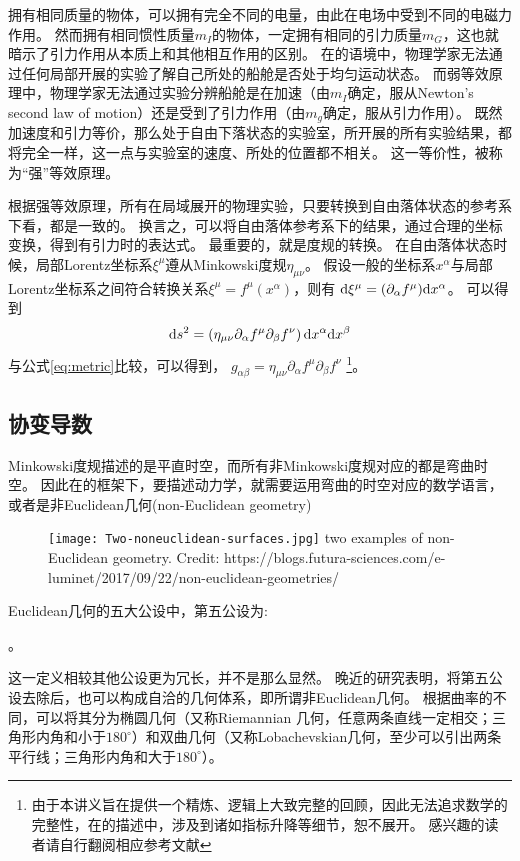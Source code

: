 拥有相同质量的物体，可以拥有完全不同的电量，由此在电场中受到不同的电磁力作用。
然而拥有相同惯性质量$m_I$的物体，一定拥有相同的引力质量$m_G$，这也就暗示了引力作用从本质上和其他相互作用的区别。
在\SR 的语境中，物理学家无法通过任何局部开展的实验了解自己所处的船舱是否处于均匀运动状态。
而弱等效原理中，物理学家无法通过实验分辨船舱是在加速（由$m_I$确定，服从Newton's second law of motion）还是受到了引力作用（由$m_g$确定，服从引力作用）。 既然加速度和引力等价，那么处于自由下落状态的实验室，所开展的所有{}实验结果，都将完全一样，这一点与实验室的速度、所处的位置都不相关。
这一等价性，被称为“强”等效原理。\cite{Schutz:FirstCourse}

根据强等效原理，所有在局域展开的物理实验，只要转换到自由落体状态的参考系下看，都是一致的。
换言之，可以将自由落体参考系下的结果，通过合理的坐标变换，得到有引力时的表达式。
最重要的，就是度规的转换。
在自由落体状态时候，局部Lorentz坐标系$\xi^\mu$遵从Minkowski度规$\eta_{\mu\nu}$。
假设一般的坐标系$x^\alpha$与局部Lorentz坐标系之间符合转换关系$\xi ^\mu= f^\mu (x^\alpha)$，则有 ${\rm d} \xi ^\mu = (\partial_\alpha f^\mu) {\rm d}x^\alpha$。
可以得到 
\begin{equation}\label{eq:STinterval_diff_GR} 
  {\rm d}s^2 = \left( \eta_ {\mu \nu} \partial_\alpha f^\mu \partial_\beta f^\nu\right){\rm d} x^\alpha {\rm d} x^\beta
\end{equation}
与公式\ref{eq:metric}比较，可以得到，
$g_{\alpha\beta} = \eta_ {\mu \nu} \partial_\alpha f^\mu \partial_\beta f^\nu$
\footnote{由于本讲义旨在提供一个精炼、逻辑上大致完整的\GR 回顾，因此无法追求数学的完整性，在\GR 的描述中，涉及到诸如指标升降等细节，恕不展开。
感兴趣的读者请自行翻阅相应参考文献}。

\subsection{协变导数} 
Minkowski度规描述的是平直时空，而所有非Minkowski度规对应的都是弯曲时空。
因此在\GR 的框架下，要描述动力学，就需要运用弯曲的时空对应的数学语言，或者是非Euclidean几何(non-Euclidean geometry)
\begin{figure}[htp]
\centering
\texttt{[image: Two-noneuclidean-surfaces.jpg]}
  {two examples of non-Euclidean geometry. Credit: https://blogs.futura-sciences.com/e-luminet/2017/09/22/non-euclidean-geometries/}
\label{fig:nonEuclidean}
\end{figure}

\begin{myprop}{}{}
  Euclidean几何的五大公设中，第五公设为:

  {}。

  这一定义相较其他公设更为冗长，并不是那么显然。
  晚近的研究表明，将第五公设去除后，也可以构成自洽的几何体系，即所谓非Euclidean几何。
  根据曲率的不同，可以将其分为椭圆几何（又称Riemannian 几何，任意两条直线一定相交；三角形内角和小于$180^\circ$）和双曲几何（又称Lobachevskian几何，至少可以引出两条平行线；三角形内角和大于$180^\circ$）。
\end{myprop}

